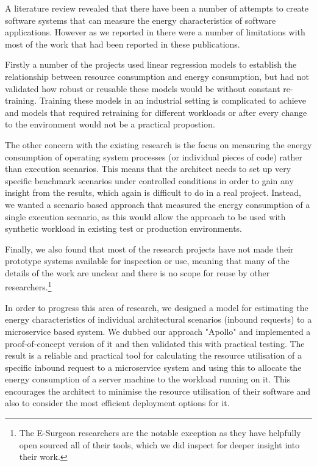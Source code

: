 A literature review revealed that there have been a number of attempts to create software systems that can measure the energy characteristics of software applications.  However as we reported in  there were a number of limitations with most of the work that had been reported in these publications.  

Firstly a number of the projects used linear regression models to establish the relationship between resource consumption and energy consumption, but had not validated how robust or reusable these models would be without constant re-training.  Training these models in an industrial setting is complicated to achieve and models that required retraining for different workloads or after every change to the environment would not be a practical propostion.  

The other concern with the existing research is the focus on measuring the energy consumption of operating system processes (or individual pieces of code) rather than execution scenarios.  This means that the architect needs to set up very specific benchmark scenarios under controlled conditions in order to gain any insight from the results, which again is difficult to do in a real project.  Instead, we wanted a scenario based approach that measured the energy consumption of a single execution scenario, as this would allow the approach to be used with synthetic workload in existing test or production environments.  

Finally, we also found that most of the research projects have not made their prototype systems available for inspection or use, meaning that many of the details of the work are unclear and there is no scope for reuse by other researchers.\footnote{The E-Surgeon researchers \cite{noureddine2015-hotspots} are the notable exception as they have helpfully open sourced all of their tools, which we did inspect for deeper insight into their work.}

In order to progress this area of research, we designed a model for estimating the energy characteristics of individual architectural scenarios (inbound requests) to a microservice based system.  We dubbed our approach "Apollo" and implemented a proof-of-concept version of it and then validated this with practical testing.  The result is a reliable and practical tool for calculating the resource utilisation of a specific inbound request to a microservice system and using this to allocate the energy consumption of a server machine to the workload running on it. This encourages the architect to minimise the resource utilisation of their software and also to consider the most efficient deployment options for it.


